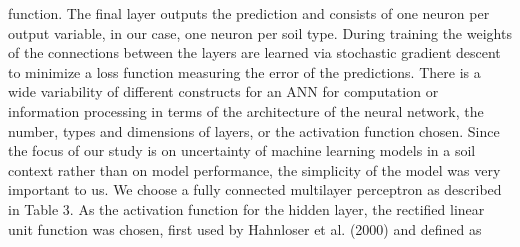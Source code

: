 function. The final layer outputs the prediction and consists of one
neuron per output variable, in our case, one neuron per soil type. During
training the weights of the connections between the layers are learned
via stochastic gradient descent to minimize a loss function measuring
the error of the predictions. There is a wide variability of different
constructs for an ANN for computation or information processing in
terms of the architecture of the neural network, the number, types and
dimensions of layers, or the activation function chosen. Since the focus
of our study is on uncertainty of machine learning models in a soil
context rather than on model performance, the simplicity of the model
was very important to us. We choose a fully connected multilayer perceptron
as described in Table 3. As the activation function for the hidden
layer, the rectified linear unit function was chosen, first used by Hahnloser
et al. (2000) and defined as 


